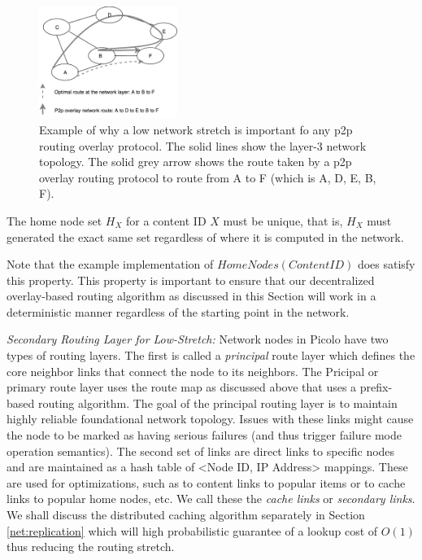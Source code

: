 \begin{figure}[h]
    \centering
    \includegraphics[width=0.40\textwidth]{fig/network-stretch.png}
  \caption{Example of why a low network stretch is important fo any p2p routing overlay protocol. The solid lines show
    the layer-3 network topology. The solid grey arrow shows the route taken by a p2p overlay routing protocol to route
    from A to F (which is A, D, E, B, F).}
    \label{fig:network-stretch}
\end{figure}

\begin{property} The home node set \(H_X\) for a content ID \(X\) must be unique, that is,
    \(H_X\) must generated the exact same set regardless of where it is computed in the network.
\label{property_unique_home}
\end{property}

Note that the example implementation of \(HomeNodes(ContentID)\) does satisfy this property. This property is important
to ensure that our decentralized overlay-based routing algorithm as discussed in this Section will work in a
deterministic manner regardless of the starting point in the network.

{\em Secondary Routing Layer for Low-Stretch:} Network nodes in Picolo have two types of routing layers. The first is
called a {\em principal} route layer which defines the core neighbor links that connect the node to its neighbors. The
Pricipal or primary route layer uses the route map as discussed above that uses a prefix-based routing algorithm. The
goal of the principal routing layer is to maintain highly reliable foundational network topology. Issues with these
links might cause the node to be marked as having serious failures (and thus trigger failure mode operation semantics).
The second set of links are direct links to specific nodes and are maintained as a hash table of <Node ID, IP Address>
mappings. These are used for optimizations, such as to content links to popular items or to cache links to popular home
nodes, etc. We call these the {\em cache links} or {\em secondary links}. We shall discuss the distributed caching
algorithm separately in Section \ref{net:replication} which will high probabilistic guarantee of a lookup cost of
\(O(1)\) thus reducing the routing stretch.

